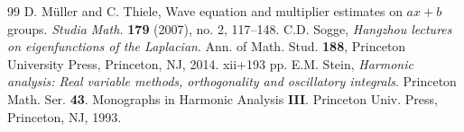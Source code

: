 \documentclass[10pt,a4paper]{amsart}
\begin{document}
\begin{thebibliography}{99}
 D. M\"{u}ller and C. Thiele, Wave equation and multiplier estimates on $ax+b$ groups. \textit{Studia Math.} \textbf{179} (2007), no. 2, 117--148.
 C.D. Sogge, \textit{Hangzhou lectures on eigenfunctions of the Laplacian}. Ann. of Math. Stud. \textbf{188}, Princeton University Press, Princeton, NJ, 2014. xii+193 pp.
 E.M. Stein, \textit{Harmonic analysis: Real variable methods, orthogonality and oscillatory integrals}. Princeton Math. Ser. \textbf{43}. Monographs in Harmonic Analysis \textbf{III}. Princeton Univ. Press, Princeton, NJ, 1993.
\end{thebibliography}
\end{document}
